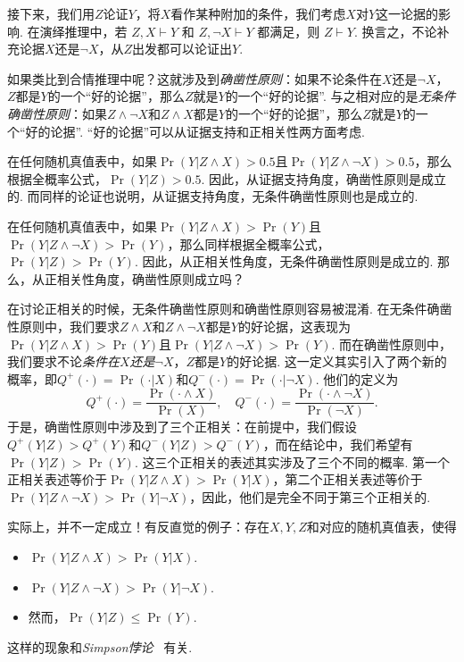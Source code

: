 接下来，我们用$Z$论证$Y$，将$X$看作某种附加的条件，我们考虑$X$对$Y$这一论据的影响. 在演绎推理中，若 $Z,X\vdash Y$ 和 $Z,\neg X\vdash Y$ 都满足，则 $Z\vdash Y$. 换言之，不论补充论据$X$还是$\neg X$，从$Z$出发都可以论证出$Y$. 

如果类比到合情推理中呢？这就涉及到\textit{确凿性原则}：如果不论条件在$X$还是$\neg X$，$Z$都是$Y$的一个“好的论据”，那么$Z$就是$Y$的一个“好的论据”. 与之相对应的是\textit{无条件确凿性原则}：如果$Z\wedge\neg X$和$Z\wedge X$都是$Y$的一个“好的论据”，那么$Z$就是$Y$的一个“好的论据”. “好的论据”可以从证据支持和正相关性两方面考虑.

在任何随机真值表中，如果$\Pr(Y|Z\wedge X)>0.5$且$\Pr(Y|Z\wedge\neg X)>0.5$，那么根据全概率公式，$\Pr(Y|Z)>0.5$. 因此，从证据支持角度，确凿性原则是成立的. 而同样的论证也说明，从证据支持角度，无条件确凿性原则也是成立的.

在任何随机真值表中，如果$\Pr(Y|Z\wedge X)>\Pr(Y)$且$\Pr(Y|Z\wedge\neg X)>\Pr(Y)$，那么同样根据全概率公式，$\Pr(Y|Z)>\Pr(Y)$. 因此，从正相关性角度，无条件确凿性原则是成立的. 那么，从正相关性角度，确凿性原则成立吗？

\begin{remark}
    在讨论正相关的时候，无条件确凿性原则和确凿性原则容易被混淆. 在无条件确凿性原则中，我们要求$Z\wedge X$和$Z\wedge\neg X$都是$Y$的好论据，这表现为$\Pr(Y|Z\wedge X)>\Pr(Y)$且$\Pr(Y|Z\wedge\neg X)>\Pr(Y)$. 而在确凿性原则中，我们要求不论\textit{条件在$X$还是$\neg X$}，$Z$都是$Y$的好论据. 这一定义其实引入了两个新的概率，即$Q^+(\cdot)=\Pr(\cdot|X)$和$Q^-(\cdot)=\Pr(\cdot|\neg X)$. 他们的定义为
    \[
    Q^+(\cdot)=\frac{\Pr(\cdot\wedge X)}{\Pr(X)},\quad Q^-(\cdot)=\frac{\Pr(\cdot\wedge \neg X)}{\Pr(\neg X)}.
    \]
    于是，确凿性原则中涉及到了三个正相关：在前提中，我们假设$Q^+(Y|Z)>Q^+(Y)$和$Q^-(Y|Z)>Q^-(Y)$，而在结论中，我们希望有$\Pr(Y|Z)>\Pr(Y)$. 这三个正相关的表述其实涉及了三个不同的概率. 第一个正相关表述等价于$\Pr(Y|Z\wedge X)>\Pr(Y|X)$，第二个正相关表述等价于$\Pr(Y|Z\wedge\neg X)>\Pr(Y|\neg X)$，因此，他们是完全不同于第三个正相关的.
\end{remark}

实际上，并不一定成立！有反直觉的例子：存在$X, Y, Z$和对应的随机真值表，使得
    \begin{itemize}
        \item $\Pr(Y| Z\wedge X)>\Pr(Y|X)$.
        \item $\Pr(Y| Z \wedge \neg X)>\Pr(Y|\neg X)$.
        \item 然而，$\Pr(Y|Z)\leq \Pr(Y)$.
    \end{itemize}
这样的现象和\textit{Simpson悖论}~\cite{simpsonInterpretationInteractionContingency1951,bickelSexBiasGraduate1975} 有关. 


